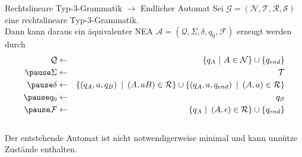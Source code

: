 \documentclass[]{beamer}
\begin{document}
\begin{frame}[squeeze]{}
  \begin{block}{Rechtslineare Typ-3-Grammatik $\to$ Endlicher Automat}
    Sei $\mathcal{G} = \left( \mathcal{N}, \mathcal{T}, \mathcal{R}, \mathcal{S} \right)$ eine rechtslineare Typ-3-Grammatik. \\
    \vspace*{0.5em}
    Dann kann daraus ein äquivalenter NEA $\mathcal{A} = \left( \mathcal{Q}, \Sigma, \delta, q_0, \mathcal{F} \right)$ erzeugt werden durch
    \pause
    \begin{eqnarray*}
      \mathcal{Q} & \leftarrow & \left\{ q_A \ | \ A \in \mathcal{N} \right\} \cup \left\{ q_{end} \right\} \\
      \pause
      \Sigma & \leftarrow & \mathcal{T} \\
      \pause
      \delta & \leftarrow & \left\{\left( q_A, a, q_B \right) \ | \ \left( A, aB \right) \in \mathcal{R} \right\} \cup \left\{ \left(q_A, a, q_{end} \right) \ | \ \left(A, a \right) \in \mathcal{R} \right\} \\
      \pause
      q_0 & \leftarrow & q_\mathcal{S} \\
      \pause
      \mathcal{F} & \leftarrow & \left\{ q_A \ | \ \left( A, \epsilon \right) \in \mathcal{R} \right\} \cup \left\{ q_{end} \right\} \\
    \end{eqnarray*}
    \\
    \vspace*{-1em}
    Der entstehende Automat ist nicht notwendigerweise minimal und kann unnütze Zustände enthalten.
  \end{block}
\end{frame}
\end{document}
